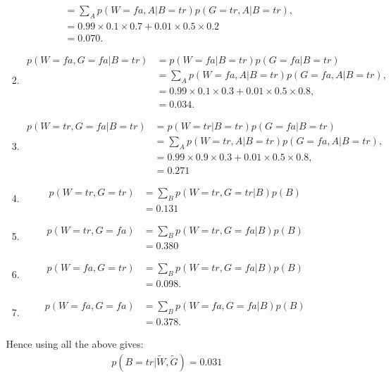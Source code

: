 \documentclass[11pt,a4paper,oneside]{report}
\begin{document}
\begin{enumerate}
\begin{enumerate}
\begin{enumerate}
\begin{align}
			&= \sum_{A} p(W=fa, A|B=tr) p(G=tr, A|B=tr),\\
			&= 0.99 \times 0.1 \times 0.7 + 0.01 \times 0.5 \times 0.2\\
			&= 0.070.
			\end{align}
			\item
			\begin{align}
			p(W=fa,G=fa|B=tr)&= p(W=fa|B=tr) p(G=fa|B=tr)\\
			&= \sum_{A} p(W=fa, A|B=tr) p(G=fa, A|B=tr),\\
			&= 0.99\times 0.1 \times 0.3 + 0.01 \times 0.5 \times 0.8,\\
			&= 0.034.
			\end{align}
			\item
			\begin{align}
			p(W=tr,G=fa|B=tr)&= p(W=tr|B=tr) p(G=fa|B=tr)\\
			&= \sum_{A} p(W=tr, A|B=tr) p(G=fa, A|B=tr),\\
			&= 0.99 \times 0.9 \times 0.3 + 0.01 \times 0.5 \times 0.8,\\
			&= 0.271
			\end{align}
			\item
			\begin{align}
			p(W=tr,G=tr)&=\sum_{B} p(W=tr,G=tr|B)p(B) \\
			&=0.131
			\end{align}
			\item
			\begin{align}
			p(W=tr,G=fa)&=\sum_{B} p(W=tr,G=fa|B)p(B) \\
			&= 0.380
			\end{align}
			\item
			\begin{align}
			p(W=fa,G=tr)&= \sum_{B} p(W=tr,G=fa|B)p(B)\\
			&=0.098.
			\end{align}
			\item
			\begin{align}
			p(W=fa,G=fa)&= \sum_{B} p(W=fa, G=fa|B)p(B) \\
			&=0.378.
			\end{align}
		\end{enumerate}
		Hence using all the above gives:
		\begin{align}
		p(B=tr|\tilde{W},\tilde{G}) = 0.031
		\end{align}
	\end{enumerate}
\end{enumerate}
\end{document}
